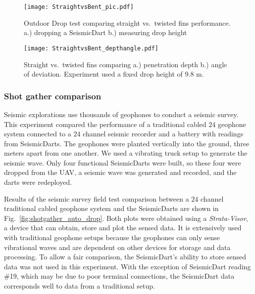 \begin{figure} \centering
  {\texttt{[image: StraightvsBent\_pic.pdf]}}
 \caption{Outdoor Drop test comparing straight vs.\ twisted fins performance.
 a.)  dropping a SeismicDart  
 b.)  measuring drop height} 
 \label{fig:StraightBentPic}
 \vspace{-1em}
\end{figure}
\begin{figure} \centering
  {\texttt{[image: StraightvsBent\_depthangle.pdf]}}
 \caption{\label{fig:StraightBentDepth}Straight vs.\ twisted fins comparing a.) penetration depth b.) angle of deviation. Experiment used a fixed drop height of 9.8 m.} 
\end{figure}

\subsubsection{Shot gather comparison}
Seismic explorations use thousands of geophones to conduct a seismic survey. 
This experiment compared the performance of a traditional cabled $24$ geophone system connected to a $24$ channel seismic recorder and a battery with readings from SeismicDarts.
The geophones were planted vertically into the ground, three meters apart from one another.  
We used a vibrating truck setup to generate the seismic wave. 
Only four functional SeismicDarts were built, so these four were dropped from the UAV, a seismic wave was generated and recorded, and the darts were redeployed.

Results of the seismic survey field test comparison between a $24$ channel traditional cabled geophone system and the SeismicDarts are shown in Fig.~\ref{fig:shotgather_auto_drop}.  
Both plots were obtained using a \emph{Strata-Visor}, a device that can obtain, store and plot the sensed data. 
It is extensively used with traditional geophone setups because the geophones can only sense vibrational waves and are dependent on other devices for storage and data processing. 
To allow a fair comparison, the SeismicDart's  ability to store sensed data was not used in this experiment. 
With the exception of SeismicDart reading \#19, which may be due to poor terminal connections, the SeismicDart data corresponds well to data from a traditional setup.


